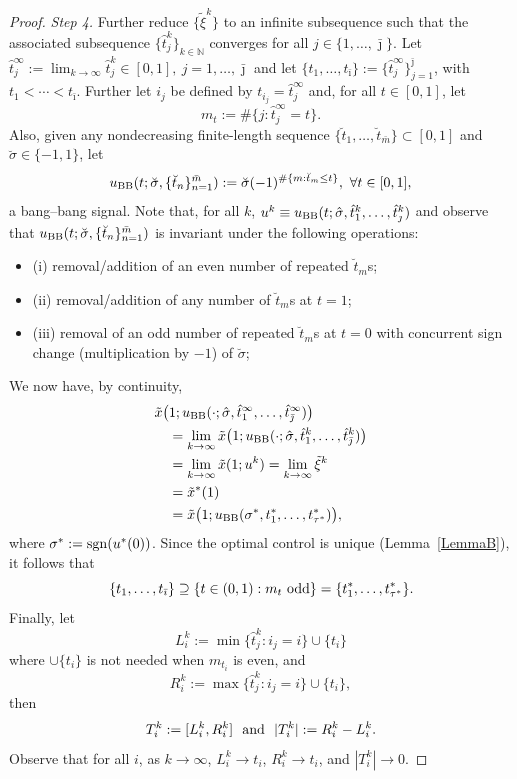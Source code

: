 \documentclass[letterpaper,10pt,conference]{ieeeconf}
\def\N{{\mathbb{N}}}
\begin{document}
\begin{proof}
\smallskip\noindent
{\em Step 4.}
Further reduce $\{\tilde\xi^k\}$ to an infinite subsequence such that the
associated subsequence $\{\hat t_j^k\}_{k\in\N}$ converges for
all $j\in\{1,\ldots,\bar\jmath\}$.  
Let 
$\hat t_j^\infty:=\lim_{k\to\infty}\hat t_j^k\in[0,1],~j=1,\ldots,\bar\jmath$
and let $\{t_1,\ldots,t_{\bar\imath}\}:=\{\hat t_j^\infty\}_{j=1}^{\bar\jmath}$,
with $t_1<\cdots <t_{\bar\imath}$.  Further let $i_j$ be defined by
$t_{i_j}=\hat t^\infty_j$ and, for all $t\in[0,1]$, let 
\[
m_t:=\#\{j:\hat t^\infty_j=t\}.
\]
  Also, given any nondecreasing finite-length sequence
$\{\breve t_1,\ldots,\breve t_{\bar m}\}\subset[0,1]$ 
and $\breve\sigma\in\{-1,1\}$, let
\[
u_{\rm BB}(t;\breve\sigma,\{\breve t_n\}_{n=1}^{\bar m})
:= \breve\sigma (-1)^{\#\{m:\breve t_m\leq t\}}, ~\forall t\in[0,1],
\]
a bang--bang signal.
Note that, for all $k$,
$u^k\equiv u_{\rm BB}(t;\hat\sigma,\hat t_1^k,\ldots,\hat t_{\jmath}^k)$ and
observe that $u_{\rm BB}(t;\breve\sigma,\{\breve t_n\}_{n=1}^{\bar m})$ is
invariant under the following operations:
\begin{itemize}
\item (i) removal/addition of an even number of repeated $\breve t_m$s;
\item (ii) removal/addition of any number of $\breve t_m$s at $t=1$;
\item (iii) removal of an odd number of repeated $\breve t_m$s at
$t=0$ with concurrent sign change (multiplication by $-1$) of $\breve\sigma$;
\end{itemize}

We now have, by continuity,
\[
\begin{aligned}
&\tilde x\bigl(1;u_{\rm BB}
(\cdot;\hat\sigma,\hat t_1^\infty,\ldots,\hat t_{\bar\jmath}^\infty)\bigr)\\
&\quad=\lim_{k\to\infty}\tilde x\bigl(1;u_{\rm BB}
(\cdot;\hat\sigma,\hat t_1^k,\ldots,\hat t_{\bar\jmath}^k)\bigr)\\
&\quad=\lim_{k\to\infty}\tilde x(1;u^k)
=\lim_{k\to\infty}\tilde\xi^k\\
&\quad=\tilde x^*(1)\\
&\quad=\tilde x\bigl(1;u_{\rm BB}
(\sigma^*,t^*_1,\ldots,t^*_{\tau^*})\bigr),
\end{aligned}
\]
where $\sigma^*:={\rm sgn}(u^*(0))$.
Since the optimal control is unique (Lemma~\ref{LemmaB}), it follows that
\[
\{t_1,\ldots,t_{\bar\imath}\} \supseteq \{t\in(0,1):m_t {\rm~odd}\}
= \{t^*_1,\ldots,t^*_{\tau^*}\}.
\]
Finally, let 
\[
L_i^k:=\min\{\hat t_j^k:i_j=i\}\cup\{t_i\}
\]
where $\cup\{t_i\}$ is not needed when $m_{t_i}$ is even, and
\[
R_i^k:=\max\{\hat t_j^k:i_j=i\}\cup\{t_i\},
\]
then
\[
T_i^k:=[L_i^k,R_i^k] ~~{\rm and~~} |T_i^k|:=R_i^k-L_i^k.
\]
Observe that for all $i$, as $k\to\infty$, $L_i^k\to t_i$, $R_i^k\to t_i$, and
$|T_i^k|\to0$.


\end{proof}
\end{document}
